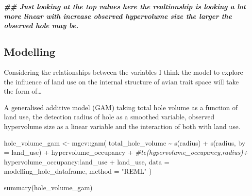 \documentclass[
]{article}
\newenvironment{Shaded}{\begin{snugshade}}{\end{snugshade}}
\newcommand{\AttributeTok}[1]{\textcolor[rgb]{0.77,0.63,0.00}{#1}}
\newcommand{\CommentTok}[1]{\textcolor[rgb]{0.56,0.35,0.01}{\textit{#1}}}
\newcommand{\DocumentationTok}[1]{\textcolor[rgb]{0.56,0.35,0.01}{\textbf{\textit{#1}}}}
\newcommand{\FunctionTok}[1]{\textcolor[rgb]{0.00,0.00,0.00}{#1}}
\newcommand{\NormalTok}[1]{#1}
\newcommand{\OtherTok}[1]{\textcolor[rgb]{0.56,0.35,0.01}{#1}}
\newcommand{\SpecialCharTok}[1]{\textcolor[rgb]{0.00,0.00,0.00}{#1}}
\newcommand{\StringTok}[1]{\textcolor[rgb]{0.31,0.60,0.02}{#1}}
\begin{document}
\begin{Shaded}
\begin{Highlighting}[]
\DocumentationTok{\#\# Just looking at the top values here the realtionship is looking a lot more linear with increase observed hypervolume size the larger the observed hole may be.}
\end{Highlighting}
\end{Shaded}

\hypertarget{modelling}{%
\subsection{Modelling}\label{modelling}}

Considering the relationships between the variables I think the model to
explore the influence of land use on the internal structure of avian
trait space will take the form of\ldots{}

A generalised additive model (GAM) taking total hole volume as a
function of land use, the detection radius of hole as a smoothed
variable, observed hypervolume size as a linear variable and the
interaction of both with land use.

\begin{Shaded}
\begin{Highlighting}[]
\NormalTok{hole\_volume\_gam }\OtherTok{\textless{}{-}}\NormalTok{ mgcv}\SpecialCharTok{::}\FunctionTok{gam}\NormalTok{(}
\NormalTok{  total\_hole\_volume }\SpecialCharTok{\textasciitilde{}} \FunctionTok{s}\NormalTok{(radius) }\SpecialCharTok{+}
    \FunctionTok{s}\NormalTok{(radius, }\AttributeTok{by =}\NormalTok{ land\_use) }\SpecialCharTok{+}
\NormalTok{    hypervolume\_occupancy }\SpecialCharTok{+}
    \CommentTok{\#te(hypervolume\_occupancy,radius)+}
\NormalTok{    hypervolume\_occupancy}\SpecialCharTok{:}\NormalTok{land\_use  }\SpecialCharTok{+}
\NormalTok{    land\_use,}
  \AttributeTok{data =}\NormalTok{ modelling\_hole\_dataframe,}
  \AttributeTok{method =} \StringTok{"REML"}
\NormalTok{)}


\FunctionTok{summary}\NormalTok{(hole\_volume\_gam)}
\end{Highlighting}
\end{Shaded}
\end{document}
